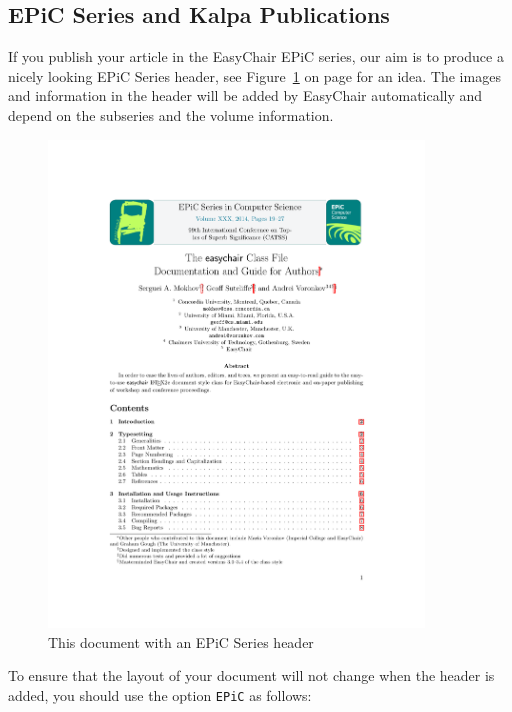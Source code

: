 \documentclass{easychair}
\begin{document}
\subsection{EPiC Series and Kalpa Publications}
\label{subsec:EPiC}

If you publish your article in the EasyChair EPiC series, our aim is to produce
a nicely looking EPiC Series header, see Figure~\ref{fig:epicheader} on page
\pageref{fig:epicheader} for an idea. The images and information in the header
will be added by EasyChair automatically and depend on the subseries and the
volume information.

\begin{figure}
  \begin{centering}
    \includegraphics[width=0.89\textwidth]{epic.pdf}
    \caption{This document with an EPiC Series header} 
    \label{fig:epicheader}
  \end{centering}
\end{figure}

To ensure that the layout of your document will not change when the header is
added, you should use the option \texttt{EPiC} as follows:
\end{document}
